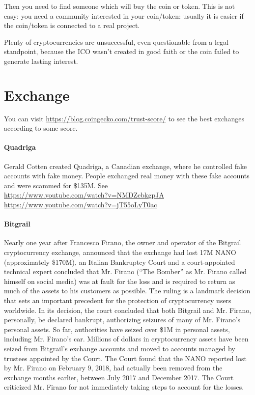 Then you need to find someone which will buy the coin or token. This is not easy: you need a community interested in your coin/token: usually it is easier if the coin/token is connected to a real project.

Plenty of cryptocurrencies are unsuccessful, even questionable from a legal standpoint, because the ICO wasn't created in good faith or the coin failed to generate lasting interest.

\section{Exchange}

You can visit \url{https://blog.coingecko.com/trust-score/} to see the best exchanges according to some score.

\paragraph{Quadriga} Gerald Cotten created Quadriga, a Canadian exchange, where he controlled fake accounts with fake money. People exchanged real money with these fake accounts and were scammed for \$135M. See\\
\url{https://www.youtube.com/watch?v=NMDZcbkgpJA}\\
\url{https://www.youtube.com/watch?v=jT55oLyT0ac}

\paragraph{Bitgrail} Nearly one year after Francesco Firano, the owner and operator of the Bitgrail cryptocurrency exchange, announced that the exchange had lost 17M NANO (approximately \$170M), an Italian Bankruptcy Court and a court-appointed technical expert concluded that Mr. Firano (``The Bomber'' as Mr. Firano called himself on social media) was at fault for the loss and is required to return as much of the assets to his customers as possible. The ruling is a landmark decision that sets an important precedent for the protection of cryptocurrency users worldwide. In its decision, the court concluded that both Bitgrail and Mr. Firano, personally, be declared bankrupt, authorizing seizures of many of Mr. Firano’s personal assets. So far, authorities have seized over \$1M in personal assets, including Mr. Firano’s car. Millions of dollars in cryptocurrency assets have been seized from Bitgrail’s exchange accounts and moved to accounts managed by trustees appointed by the Court. The Court found that the NANO reported lost by Mr. Firano on February 9, 2018, had actually been removed from the exchange months earlier, between July 2017 and December 2017. The Court criticized Mr. Firano for not immediately taking steps to account for the losses.

